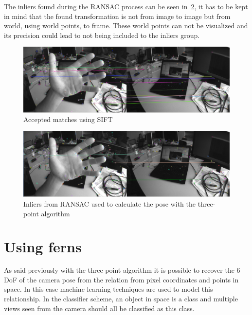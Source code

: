 The inliers found during the RANSAC process can be seen in~\ref{fig:3pt_inliers}, it has to be kept in mind that the found transformation is not from image to image but from world, using world points, to frame. These world points can not be visualized and its precision could lead to not being included to the inliers group.\\

\begin{figure}[htpb]
  \centering
  \includegraphics[width=1.0\linewidth]{img/3pt_matches_1.png}
  \caption{Accepted matches using SIFT}
  \label{fig:3pt_matches}
\end{figure}


\begin{figure}[htpb]
  \centering
  \includegraphics[width=1.0\linewidth]{img/3pt_inliers_1.png}
  \caption{Inliers from RANSAC used to calculate the pose with the three-point algorithm }
  \label{fig:3pt_inliers}
\end{figure}


\section{Using ferns}
\label{sec:using_ferns}

As said previously with the three-point algorithm it is possible to recover the 6 DoF of the camera pose from the relation from pixel coordinates and points in space. In this case machine learning techniques are used to model this relationship. In the classifier scheme, an object in space is a class and multiple views seen from the camera should all be classified as this class.\\

